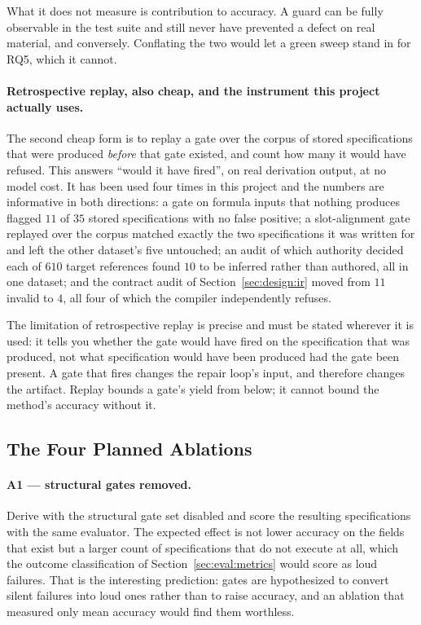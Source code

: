 What it does not measure is contribution to accuracy. A guard can be fully observable in the
test suite and still never have prevented a defect on real material, and conversely.
Conflating the two would let a green sweep stand in for RQ5, which it cannot.

\paragraph{Retrospective replay, also cheap, and the instrument this project actually uses.}
The second cheap form is to replay a gate over the corpus of stored specifications that were
produced \emph{before} that gate existed, and count how many it would have refused. This
answers ``would it have fired'', on real derivation output, at no model cost. It has been used
four times in this project and the numbers are informative in both directions: a gate on
formula inputs that nothing produces flagged $11$ of $35$ stored specifications with no false
positive; a slot-alignment gate replayed over the corpus matched exactly the two specifications
it was written for and left the other dataset's five untouched; an audit of which authority
decided each of $610$ target references found $10$ to be inferred rather than authored, all in
one dataset; and the contract audit of Section~\ref{sec:design:ir} moved from $11$ invalid to
$4$, all four of which the compiler independently refuses.

The limitation of retrospective replay is precise and must be stated wherever it is used: it
tells you whether the gate would have fired on the specification that was produced, not what
specification would have been produced had the gate been present. A gate that fires changes the
repair loop's input, and therefore changes the artifact. Replay bounds a gate's yield from
below; it cannot bound the method's accuracy without it.

\subsection{The Four Planned Ablations}

\paragraph{A1 --- structural gates removed.}
Derive with the structural gate set disabled and score the resulting specifications with the
same evaluator. The expected effect is not lower accuracy on the fields that exist but a larger
count of specifications that do not execute at all, which the outcome classification of
Section~\ref{sec:eval:metrics} would score as loud failures. That is the interesting prediction:
gates are hypothesized to convert silent failures into loud ones rather than to raise accuracy,
and an ablation that measured only mean accuracy would find them worthless.

